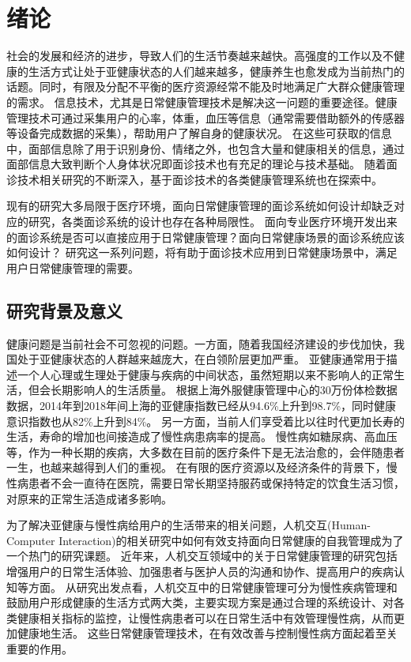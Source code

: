 \chapter{绪论}

社会的发展和经济的进步，导致人们的生活节奏越来越快。高强度的工作以及不健康的生活方式让处于亚健康状态的人们越来越多，健康养生也愈发成为当前热门的话题。同时，有限及分配不平衡的医疗资源经常不能及时地满足广大群众健康管理的需求\cite{雷鹏2019中国医疗资源配置与服务利用现状评价}。
信息技术，尤其是日常健康管理技术是解决这一问题的重要途径。健康管理技术可通过采集用户的心率，体重，血压等信息（通常需要借助额外的传感器等设备完成数据的采集），帮助用户了解自身的健康状况。
在这些可获取的信息中，面部信息除了用于识别身份、情绪之外，也包含大量和健康相关的信息，通过面部信息大致判断个人身体状况即面诊技术也有充足的理论与技术基础\cite{li2020tcminet}。
随着面诊技术相关研究的不断深入，基于面诊技术的各类健康管理系统也在探索中\cite{林锋2019中医面诊系统调研报告}。

现有的研究大多局限于医疗环境，面向日常健康管理的面诊系统如何设计却缺乏对应的研究，各类面诊系统的设计也存在各种局限性。
面向专业医疗环境开发出来的面诊系统是否可以直接应用于日常健康管理？面向日常健康场景的面诊系统应该如何设计？
研究这一系列问题，将有助于面诊技术应用到日常健康场景中，满足用户日常健康管理的需要。

\section{研究背景及意义}
健康问题是当前社会不可忽视的问题。一方面，随着我国经济建设的步伐加快，我国处于亚健康状态的人群越来越庞大，在白领阶层更加严重。
亚健康通常用于描述一个人心理或生理处于健康与疾病的中间状态，虽然短期以来不影响人的正常生活，但会长期影响人的生活质量。
根据上海外服健康管理中心的30万份体检数据数据，2014年到2018年间上海的亚健康指数已经从94.6\%上升到98.7\%，同时健康意识指数也从82\%上升到84\%\cite{health_report2019}。
另一方面，当前人们享受着比以往时代更加长寿的生活，寿命的增加也间接造成了慢性病患病率的提高\cite{OlshanskyDEMOGRAPHY}。
慢性病如糖尿病、高血压等，作为一种长期的疾病，大多数在目前的医疗条件下是无法治愈的，会伴随患者一生，也越来越得到人们的重视\cite{blandford2019hci}。
在有限的医疗资源以及经济条件的背景下，慢性病患者不会一直待在医院，需要日常长期坚持服药或保持特定的饮食生活习惯，对原来的正常生活造成诸多影响\cite{lupton2017self-tracking}。

为了解决亚健康与慢性病给用户的生活带来的相关问题，人机交互(Human-Computer Interaction)的相关研究中如何有效支持面向日常健康的自我管理成为了一个热门的研究课题。
近年来，人机交互领域中的关于日常健康管理的研究包括增强用户的日常生活体验、加强患者与医护人员的沟通和协作、提高用户的疾病认知等方面。
从研究出发点看，人机交互中的日常健康管理可分为慢性疾病管理和鼓励用户形成健康的生活方式两大类，主要实现方案是通过合理的系统设计、对各类健康相关指标的监控，让慢性病患者可以在日常生活中有效管理慢性病，从而更加健康地生活。
这些日常健康管理技术，在有效改善与控制慢性病方面起着至关重要的作用\cite{ayobi2017quantifying}。

